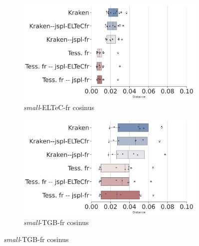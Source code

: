 \begin{figure}[h!]
   \centering
      \begin{subfigure}{0.45\textwidth}
      \hspace{-0.75cm}
  \includegraphics[height=.58\textwidth]{IMAGES/Boite-a_moustache_12072024/ELTeC_fra_spaCy3.5.1/ELTeC_fra_spaCy3.5.1-cosinus-sim2-3.png} 
        \caption{\textit{small}-ELTeC-fr cosinus}
        \label{fig:ELTeC-Fra_REF_cosinus}
   \end{subfigure}
       \begin{subfigure}{0.45\textwidth}
  \includegraphics[height=.58\textwidth]{IMAGES/Boite-a_moustache_12072024/TGB_spaCy3.5.1/DATA_TGB-2023_spaCy3.5.1_Distance-cosinus-sim2-3.png} 
        \caption{\textit{small}-TGB-fr cosinus}
        \label{fig:small-TGB_REF_cosinus}
   \end{subfigure}
   

\end{figure}
